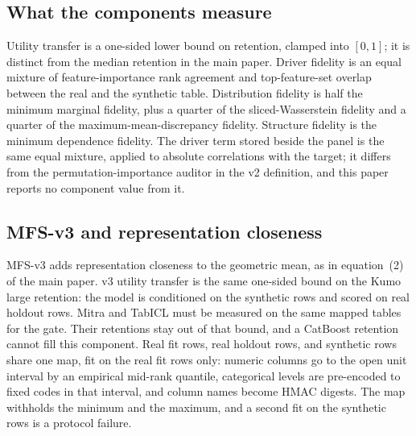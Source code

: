 \documentclass{article}
\begin{document}
\subsection{What the components measure}
Utility transfer is a one-sided lower bound on retention, clamped into $[0,1]$; it is distinct from the median retention in the main paper. Driver fidelity is an equal mixture of feature-importance rank agreement and top-feature-set overlap between the real and the synthetic table. Distribution fidelity is half the minimum marginal fidelity, plus a quarter of the sliced-Wasserstein fidelity and a quarter of the maximum-mean-discrepancy fidelity. Structure fidelity is the minimum dependence fidelity. The driver term stored beside the panel is the same equal mixture, applied to absolute correlations with the target; it differs from the permutation-importance auditor in the v2 definition, and this paper reports no component value from it.

\subsection{MFS-v3 and representation closeness}
MFS-v3 adds representation closeness to the geometric mean, as in equation~(2) of the main paper. v3 utility transfer is the same one-sided bound on the Kumo large retention: the model is conditioned on the synthetic rows and scored on real holdout rows. Mitra and TabICL must be measured on the same mapped tables for the gate. Their retentions stay out of that bound, and a CatBoost retention cannot fill this component. Real fit rows, real holdout rows, and synthetic rows share one map, fit on the real fit rows only: numeric columns go to the open unit interval by an empirical mid-rank quantile, categorical levels are pre-encoded to fixed codes in that interval, and column names become HMAC digests. The map withholds the minimum and the maximum, and a second fit on the synthetic rows is a protocol failure.
\end{document}
